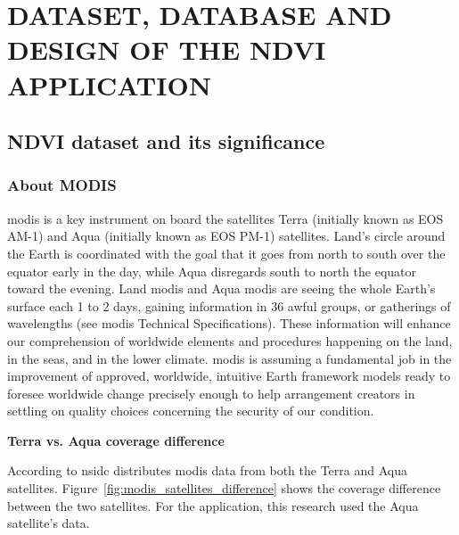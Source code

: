\chapter{DATASET, DATABASE AND DESIGN OF THE NDVI APPLICATION}
\label{chap:dataset & database}

\section{NDVI dataset and its significance}

\subsection{About MODIS}

\newcommand{\MYhref}[3][blue]{\href{#2}{\color{#1}{#3}}}%

\centerline{\MYhref{https://modis.gsfc.nasa.gov/}{NASA's MODIS website}}

\gls{modis} is a key instrument on board the satellites Terra (initially known as EOS AM-1) and Aqua (initially known as EOS PM-1) satellites. Land's circle around the Earth is coordinated with the goal that it goes from north to south over the equator early in the day, while Aqua disregards south to north the equator toward the evening. Land \gls{modis} and Aqua \gls{modis} are seeing the whole Earth's surface each 1 to 2 days, gaining information in 36 awful groups, or gatherings of wavelengths (see \gls{modis} Technical Specifications). These information will enhance our comprehension of worldwide elements and procedures happening on the land, in the seas, and in the lower climate. \gls{modis} is assuming a fundamental job in the improvement of approved, worldwide, intuitive Earth framework models ready to foresee worldwide change precisely enough to help arrangement creators in settling on quality choices concerning the security of our condition. \cite{MODIS} \\
\centerline{\textbf{Terra vs. Aqua coverage difference}}
According to \gls{nsidc} distributes \gls{modis} data from both the Terra and Aqua satellites. Figure~\ref{fig:modis_satellites_difference} shows the coverage difference between the two satellites. For the application, this research used the Aqua satellite's data.

